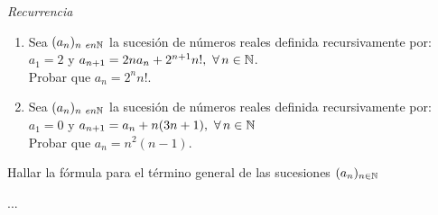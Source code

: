 \documentclass[12pt,a4paper, spanish]{article}
\begin{document}
\separador

\textit{Recurrencia}


\ejercicio
\begin{enumerate}[label=\roman*)]
	\item
	      Sea $(a_n)_{n\ en \mathbb N}$ la sucesión de números reales definida recursivamente por:\\
        $a_1 = 2$ y $a_{n+1} = 2 n a_n+ 2^{n+1}n!,\, \,\forall\, n \in \mathbb N$.\\
	      Probar que $a_n = 2^n n!$.\\
        
	\item
	      Sea $(a_n)_{n\ en \mathbb N}$ la sucesión de números reales definida recursivamente por:\\
	      $a_1 = 0$ y $a_{n+1} = a_n + n(3n + 1),\, \,\forall\, n \in \mathbb N$\\
        Probar que $a_n = n^2 (n-1)$.\\

\end{enumerate}

\ejercicio
Hallar la fórmula para el término general de las sucesiones $(a_n)_{n \in \mathbb N}$

\ejercicio
...

\update
\end{document}
